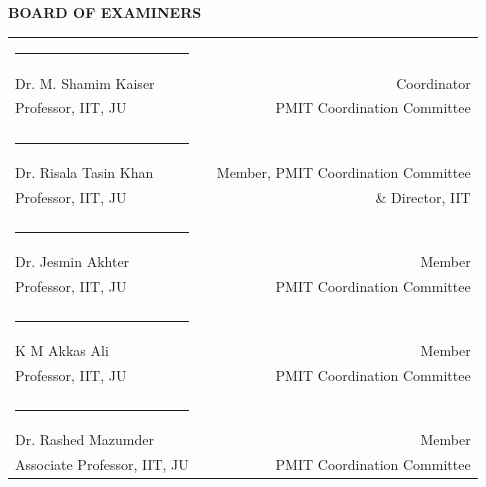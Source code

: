 \begin{center}
   \textbf{BOARD OF EXAMINERS}
\end{center}
\noindent \begin{tabular}{lp{1cm}r}
\centering
  \rule{4cm}{1pt}&\\
     Dr. M. Shamim Kaiser  &&Coordinator  \\
     Professor, IIT, JU  & & PMIT Coordination Committee  \\
     & &  \\
     \rule{4cm}{1pt}&\\
    Dr. Risala Tasin Khan  & & Member, PMIT Coordination Committee   \\
     Professor, IIT, JU& &\& Director, IIT\\
    & &  \\
     \rule{4cm}{1pt}&\\
      Dr. Jesmin Akhter & &Member  \\
      Professor, IIT, JU  & &PMIT Coordination Committee  \\
     &  \\
     \rule{4cm}{1pt}&\\
      K M Akkas Ali  & &Member  \\
      Professor, IIT, JU  & &PMIT Coordination Committee  \\
      &  \\
     \rule{4cm}{1pt}&\\
     Dr. Rashed Mazumder  & &Member  \\
      Associate Professor, IIT, JU  & &PMIT Coordination Committee  \\  

   

\end{tabular}

